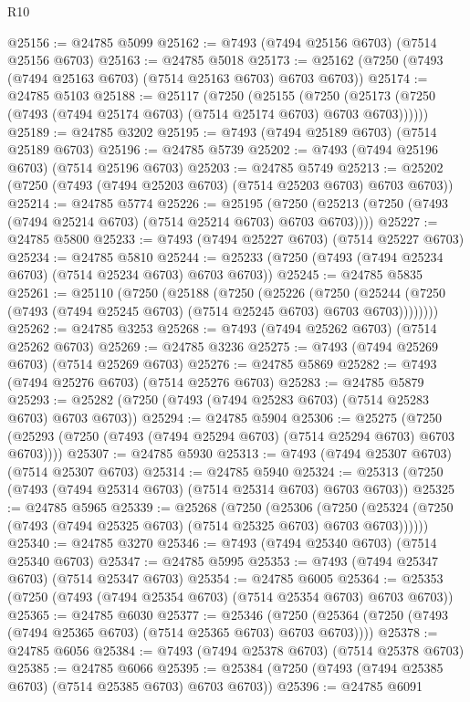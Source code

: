 \begin{lexlean}{R10}
\begin{coremodule}
{{{{{{{{{{{{{{{{{{{{{{{{{{{{{{{{{{{{{{{{{{{{{{{{{{{{{{{{{{{{{{{{{{{{{{{{{{{{{{{{{{{{@25156 := @24785 @5099
@25162 := @7493 (@7494 @25156 @6703) (@7514 @25156 @6703)
@25163 := @24785 @5018
@25173 := @25162 (@7250 (@7493 (@7494 @25163 @6703) (@7514 @25163 @6703) @6703 @6703))
@25174 := @24785 @5103
@25188 := @25117
    (@7250
      (@25155
        (@7250 (@25173 (@7250 (@7493 (@7494 @25174 @6703) (@7514 @25174 @6703) @6703 @6703))))))
@25189 := @24785 @3202
@25195 := @7493 (@7494 @25189 @6703) (@7514 @25189 @6703)
@25196 := @24785 @5739
@25202 := @7493 (@7494 @25196 @6703) (@7514 @25196 @6703)
@25203 := @24785 @5749
@25213 := @25202 (@7250 (@7493 (@7494 @25203 @6703) (@7514 @25203 @6703) @6703 @6703))
@25214 := @24785 @5774
@25226 := @25195
    (@7250 (@25213 (@7250 (@7493 (@7494 @25214 @6703) (@7514 @25214 @6703) @6703 @6703))))
@25227 := @24785 @5800
@25233 := @7493 (@7494 @25227 @6703) (@7514 @25227 @6703)
@25234 := @24785 @5810
@25244 := @25233 (@7250 (@7493 (@7494 @25234 @6703) (@7514 @25234 @6703) @6703 @6703))
@25245 := @24785 @5835
@25261 := @25110
    (@7250
      (@25188
        (@7250
          (@25226
            (@7250
              (@25244 (@7250 (@7493 (@7494 @25245 @6703) (@7514 @25245 @6703) @6703 @6703))))))))
@25262 := @24785 @3253
@25268 := @7493 (@7494 @25262 @6703) (@7514 @25262 @6703)
@25269 := @24785 @3236
@25275 := @7493 (@7494 @25269 @6703) (@7514 @25269 @6703)
@25276 := @24785 @5869
@25282 := @7493 (@7494 @25276 @6703) (@7514 @25276 @6703)
@25283 := @24785 @5879
@25293 := @25282 (@7250 (@7493 (@7494 @25283 @6703) (@7514 @25283 @6703) @6703 @6703))
@25294 := @24785 @5904
@25306 := @25275
    (@7250 (@25293 (@7250 (@7493 (@7494 @25294 @6703) (@7514 @25294 @6703) @6703 @6703))))
@25307 := @24785 @5930
@25313 := @7493 (@7494 @25307 @6703) (@7514 @25307 @6703)
@25314 := @24785 @5940
@25324 := @25313 (@7250 (@7493 (@7494 @25314 @6703) (@7514 @25314 @6703) @6703 @6703))
@25325 := @24785 @5965
@25339 := @25268
    (@7250
      (@25306
        (@7250 (@25324 (@7250 (@7493 (@7494 @25325 @6703) (@7514 @25325 @6703) @6703 @6703))))))
@25340 := @24785 @3270
@25346 := @7493 (@7494 @25340 @6703) (@7514 @25340 @6703)
@25347 := @24785 @5995
@25353 := @7493 (@7494 @25347 @6703) (@7514 @25347 @6703)
@25354 := @24785 @6005
@25364 := @25353 (@7250 (@7493 (@7494 @25354 @6703) (@7514 @25354 @6703) @6703 @6703))
@25365 := @24785 @6030
@25377 := @25346
    (@7250 (@25364 (@7250 (@7493 (@7494 @25365 @6703) (@7514 @25365 @6703) @6703 @6703))))
@25378 := @24785 @6056
@25384 := @7493 (@7494 @25378 @6703) (@7514 @25378 @6703)
@25385 := @24785 @6066
@25395 := @25384 (@7250 (@7493 (@7494 @25385 @6703) (@7514 @25385 @6703) @6703 @6703))
@25396 := @24785 @6091
}}}}}}}}}}}}}}}}}}}}}}}}}}}}}}}}}}}}}}}}}}}}}}}}}}}}}}}}}}}}}}}}}}}}}}}}}}}}}}}}}}}}
\end{coremodule}
\end{lexlean}
